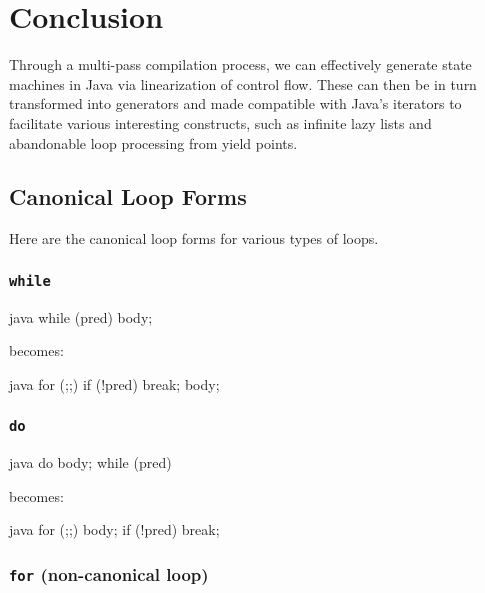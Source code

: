 \documentclass[journal,a4paper]{IEEEtran}
\begin{document}
\section{Conclusion}

Through a multi-pass compilation process, we can effectively generate state machines in Java via
linearization of control flow. These can then be in turn transformed into generators and made
compatible with Java's iterators to facilitate various interesting constructs, such as infinite
lazy lists and abandonable loop processing from yield points.

\appendix
\subsection{Canonical Loop Forms} \label{appendix:canonical-loop-forms}

Here are the canonical loop forms for various types of loops.

\subsubsection{\texttt{while}}

\begin{pygmented}{java}
while (pred) {
    body;
}
\end{pygmented}

becomes:

\begin{pygmented}{java}
for (;;) {
    if (!pred) break;
    body;
}
\end{pygmented}

\subsubsection{\texttt{do}}

\begin{pygmented}{java}
do {
    body;
} while (pred)
\end{pygmented}

becomes:

\begin{pygmented}{java}
for (;;) {
    body;
    if (!pred) break;
}
\end{pygmented}

\subsubsection{\texttt{for} (non-canonical loop)}
\end{document}
